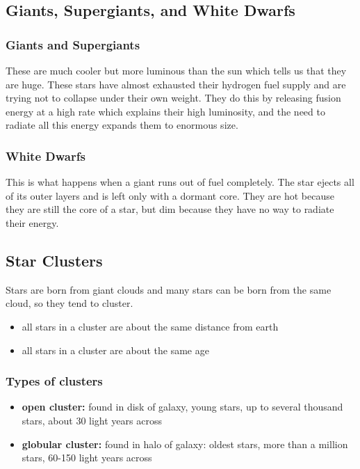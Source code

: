 \documentclass[12pt]{article}
\begin{document}
\subsection{Giants, Supergiants, and White Dwarfs}
\subsubsection{Giants and Supergiants}
These are much cooler but more luminous than the sun which tells us that they are huge. These stars have almost exhausted their hydrogen fuel supply and are trying not to collapse under their own weight. They do this by releasing fusion energy at a high rate which explains their high luminosity, and the need to radiate all this energy expands them to enormous size.

\subsubsection{White Dwarfs}
This is what happens when a giant runs out of fuel completely. The star ejects all of its outer layers and is left only with a dormant core. They are hot because they are still the core of a star, but dim because they have no way to radiate their energy.

\subsection{Star Clusters}
Stars are born from giant clouds and many stars can be born from the same cloud, so they tend to cluster.
\begin{itemize}
\item all stars in a cluster are about the same distance from earth
\item all stars in a cluster are about the same age
\end{itemize}

\subsubsection{Types of clusters}
\begin{itemize}
\item \textbf{open cluster: }found in disk of galaxy, young stars, up to several thousand stars, about 30 light years across
\item \textbf{globular cluster: }found in halo of galaxy: oldest stars, more than a million stars, 60-150 light years across
\end{itemize}
\end{document}
